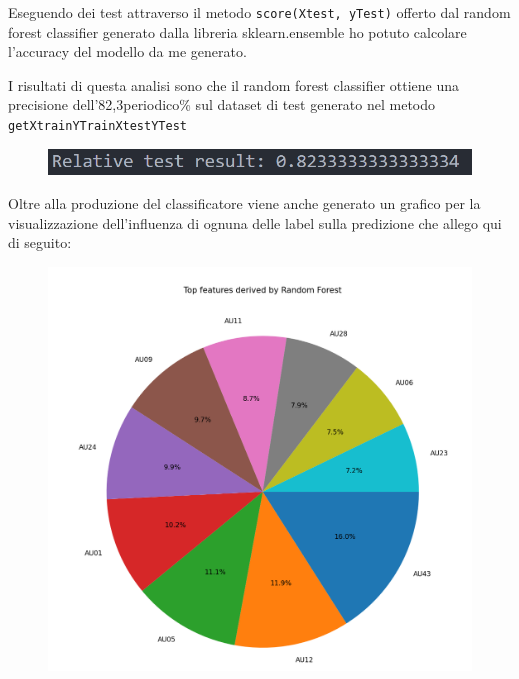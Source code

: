 Eseguendo dei test attraverso il metodo \texttt{score(Xtest, yTest)} offerto dal random forest classifier generato dalla libreria sklearn.ensemble ho potuto calcolare l’accuracy del modello da me generato.

I risultati di questa analisi sono che il random forest classifier ottiene una precisione dell’82,3periodico\% sul dataset di test generato nel metodo \texttt{getXtrainYTrainXtestYTest}

\begin{figure}
    \begin{center}    
        \includegraphics[width=0.9\linewidth]{images/image36.png}
    \end{center}
\end{figure}

Oltre alla produzione del classificatore viene anche generato un grafico per la visualizzazione dell’influenza di ognuna delle label sulla predizione che allego qui di seguito:
\newpage
\begin{figure}
    \begin{center}    
        \includegraphics[width=1\linewidth]{images/image37.png}
    \end{center}
\end{figure}

